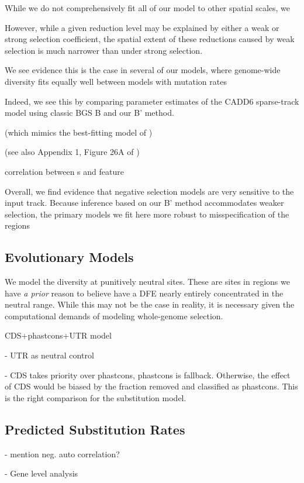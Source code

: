 \documentclass[11pt]{article}
\begin{document}
While we do not comprehensively fit all of our model to other spatial scales,
we 

However, while a given reduction level may be explained by either a weak or
strong selection coefficient, the spatial extent of these reductions caused by
weak selection is much narrower than under strong selection. 

We see evidence this is the case in several of our models, where
genome-wide diversity fits equally well between models with mutation rates 

Indeed, we see this by comparing parameter estimates of the CADD6
sparse-track model using classic BGS B and our B' method. 


(which mimics the best-fitting model of
\cite{Murphy2022-sj}) 

(see also
Appendix 1, Figure 26A of \cite{Murphy2022-sj})

correlation between s and feature

Overall, we find evidence that negative selection models are very sensitive to
the input track. Because inference based on our B' method accommodates weaker
selection, the primary models we fit here more robust to misspecification of
the regions

\subsection*{Evolutionary Models}

We model the diversity at punitively neutral sites. These are sites in regions
we have \emph{a prior} reason to believe have a DFE nearly entirely
concentrated in the neutral range. While this may not be the case in reality,
it is necessary given the computational demands of modeling whole-genome
selection. 

CDS+phastcons+UTR model

 - UTR as neutral control

 - CDS takes priority over phastcons, phastcons is fallback. Otherwise, the
   effect of CDS would be biased by the fraction removed and classified as
   phastcons. This is the right comparison for the substitution model.

\subsection*{Predicted Substitution Rates}

- mention neg. auto correlation?

- Gene level analysis
\end{document}

